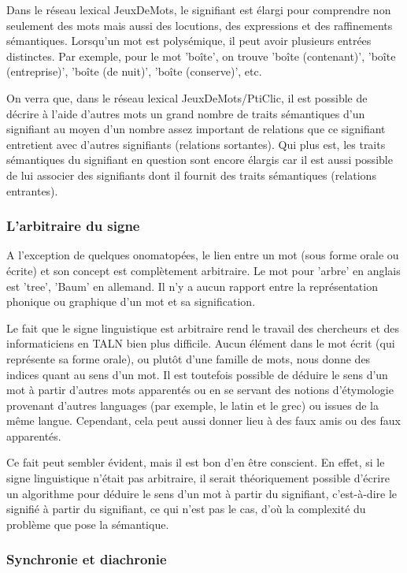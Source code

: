 \documentclass[a4paper,11pt,french]{article}
\begin{document}
Dans le réseau lexical JeuxDeMots, le signifiant est élargi pour comprendre non seulement des mots mais aussi des locutions, des expressions et des raffinements sémantiques. Lorsqu'un mot est polysémique, il peut avoir plusieurs entrées distinctes. Par exemple, pour le mot 'boîte', on trouve 'boîte (contenant)', 'boîte (entreprise)', 'boîte (de nuit)', 'boîte (conserve)', etc.

On verra que, dans le réseau lexical JeuxDeMots/PtiClic, il est possible de décrire à l'aide d'autres mots un grand nombre de traits sémantiques d'un signifiant au moyen d'un nombre assez important de relations que ce signifiant entretient avec d'autres signifiants (relations sortantes). Qui plus est, les traits sémantiques du signifiant en question sont encore élargis car il est aussi possible de lui associer des signifiants dont il fournit des traits sémantiques (relations entrantes). 

\subsubsection{L'arbitraire du signe}

A l'exception de quelques onomatopées, le lien entre un mot (sous forme orale ou écrite) et son concept est complètement arbitraire. Le mot pour 'arbre' en anglais est 'tree', 'Baum' en allemand. Il n'y a aucun rapport entre la représentation phonique ou graphique d'un mot et sa signification.

Le fait que le signe linguistique est arbitraire rend le travail des chercheurs et des informaticiens en TALN bien plus difficile. Aucun élément dans le mot écrit (qui représente sa forme orale), ou plutôt d'une famille de mots, nous donne des indices quant au sens d'un mot. Il est toutefois possible de déduire le sens d'un mot à partir d'autres mots apparentés ou en se servant des notions d'étymologie provenant d'autres languages (par exemple, le latin et le grec) ou issues de la même langue. Cependant, cela peut aussi donner lieu à des faux amis ou des faux apparentés. 

Ce fait peut sembler évident, mais il est bon d'en être conscient. En effet, si le signe linguistique n'était pas arbitraire, il serait théoriquement possible d'écrire un algorithme pour déduire le sens d'un mot à partir du signifiant, c'est-à-dire le signifié à partir du signifiant, ce qui n'est pas le cas, d'où la complexité du problème que pose la sémantique. 


\subsubsection{Synchronie et diachronie}
\end{document}
